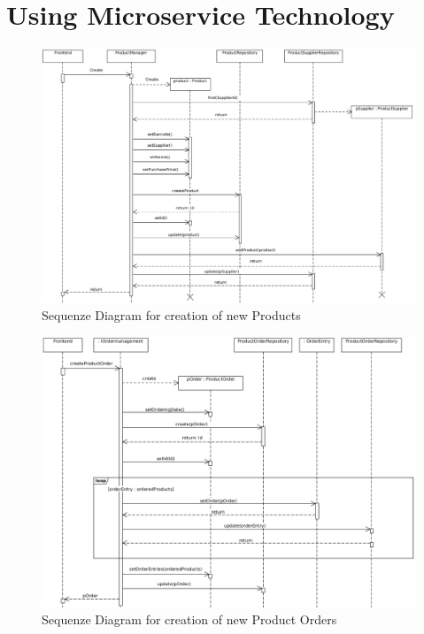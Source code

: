 \FloatBarrier
 
 
 \section{Using Microservice Technology}\label{MicroserviceImplementation}
 
\begin{figure}[h]
	\includegraphics[width = \textwidth]{img/seqProductCreate.png}
	\caption{Sequenze Diagram for creation of new Products}
	\label{seqCreateProduct}
\end{figure}

\begin{figure}[h]
	\includegraphics[width = \textwidth]{img/SeqProductOrderEntry.png}
	\caption{Sequenze Diagram for creation of new Product Orders}
	\label{seqProductOrder}
\end{figure}